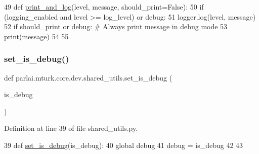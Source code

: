 \begin{DoxyCode}
49 \textcolor{keyword}{def }\hyperlink{namespaceparlai_1_1mturk_1_1core_1_1shared__utils_a9ffb0cdb3846323e276281cbeb16979a}{print\_and\_log}(level, message, should\_print=False):
50     \textcolor{keywordflow}{if} (logging\_enabled \textcolor{keywordflow}{and} level >= log\_level) \textcolor{keywordflow}{or} debug:
51         logger.log(level, message)
52     \textcolor{keywordflow}{if} should\_print \textcolor{keywordflow}{or} debug:  \textcolor{comment}{# Always print message in debug mode}
53         print(message)
54 
55 
\end{DoxyCode}
\mbox{\label{namespaceparlai_1_1mturk_1_1core_1_1dev_1_1shared__utils_ab4f57426e99620d33845f619d7697eb4}} 
\subsubsection{\texorpdfstring{set\+\_\+is\+\_\+debug()}{set\_is\_debug()}}
{\footnotesize\ttfamily def parlai.\+mturk.\+core.\+dev.\+shared\+\_\+utils.\+set\+\_\+is\+\_\+debug (\begin{DoxyParamCaption}\item[{}]{is\+\_\+debug }\end{DoxyParamCaption})}



Definition at line 39 of file shared\+\_\+utils.\+py.


\begin{DoxyCode}
39 \textcolor{keyword}{def }\hyperlink{namespaceparlai_1_1mturk_1_1core_1_1shared__utils_a8446a65c83fee3ccdfb7484ff5f3eedd}{set\_is\_debug}(is\_debug):
40     \textcolor{keyword}{global} debug
41     debug = is\_debug
42 
43 
\end{DoxyCode}
\mbox{\label{namespaceparlai_1_1mturk_1_1core_1_1dev_1_1shared__utils_a2d38b1a3db8a14e8fd0b37519d94a25d}} 
